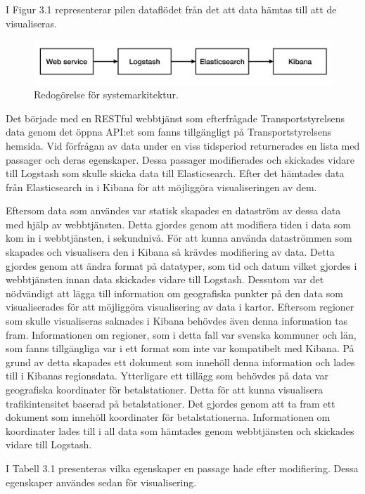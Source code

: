 \documentclass[12pt]{kththesis}
\begin{document}
I Figur 3.1 representerar pilen dataflödet från det att data hämtas till att de visualiseras. 

\begin{figure}[h]
\centering
\includegraphics[width=1\textwidth]{Systemarkitektur}
\caption{Redogörelse för systemarkitektur.}
\end{figure}

Det började med en RESTful webbtjänst som efterfrågade Transportstyrelsens data genom det öppna API:et som fanns tillgängligt på Transportstyrelsens hemsida. Vid förfrågan av data under en viss tidsperiod returnerades en lista med passager och deras egenskaper. Dessa passager modifierades och skickades vidare till Logstash som skulle skicka data till Elasticsearch. Efter det hämtades data från Elasticsearch in i Kibana för att möjliggöra visualiseringen av dem.  

Eftersom data som användes var statisk skapades en dataström av dessa data med hjälp av webbtjänsten. Detta gjordes genom att modifiera tiden i data som kom in i webbtjänsten, i sekundnivå. För att kunna använda dataströmmen som skapades och visualisera den i Kibana så krävdes modifiering av data. Detta gjordes genom att ändra format på datatyper, som tid och datum vilket gjordes i webbtjänsten innan data skickades vidare till Logstash. Dessutom var det nödvändigt att lägga till information om geografiska punkter på den data som visualiserades för att möjliggöra visualisering av data i kartor. Eftersom regioner som skulle visualiseras saknades i Kibana behövdes även denna information tas fram. Informationen om regioner, som i detta fall var svenska kommuner och län, som fanns tillgängliga var i ett format som inte var kompatibelt med Kibana. På grund av detta skapades ett dokument som innehöll denna information och lades till i Kibanas regionsdata. Ytterligare ett tillägg som behövdes på data var geografiska koordinater för betalstationer. Detta för att kunna visualisera trafikintensitet baserad på betalstationer. Det gjordes genom att ta fram ett dokument som innehöll koordinater för betalstationerna. Informationen om koordinater lades till i all data som hämtades genom webbtjänsten och skickades vidare till Logstash. 

I Tabell 3.1 presenteras vilka egenskaper en passage hade efter modifiering. Dessa egenskaper användes sedan för visualisering. 
\end{document}
